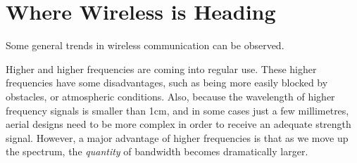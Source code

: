 \section{Where Wireless is Heading}

Some general trends in wireless communication can be observed. 

Higher and higher frequencies are coming into regular use. These higher frequencies have some disadvantages, such
as being more easily blocked by obstacles, or atmospheric conditions. Also, because the wavelength
of higher frequency signals is smaller than 1cm, and in some cases just a few millimetres, aerial designs need
to be more complex in order to receive an adequate strength signal. However, a major advantage of higher frequencies
is that as we move up the spectrum, the {\em quantity} of bandwidth  becomes dramatically larger.
